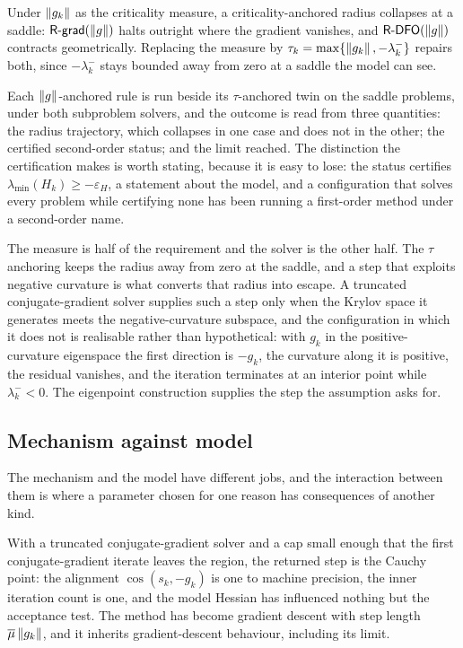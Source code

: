 \documentclass[11pt]{article}
\theoremstyle{plain}
\theoremstyle{definition}
\theoremstyle{remark}
\numberwithin{equation}{section}
\newcommand{\Rdfo}{\textsf{R-DFO}}
\newcommand{\Rgrad}{\textsf{R-grad}}
\begin{document}
Under $\left \lVert g_k \right \rVert$ as the criticality measure, a criticality-anchored radius
collapses at a saddle: $\Rgrad(\norm{g})$ halts outright where the gradient
vanishes, and $\Rdfo(\norm{g})$ contracts geometrically. Replacing the measure by
$\tau_k = \max\{\left \lVert g_k \right \rVert, -\lambda_k^-\}$ repairs both, since
$-\lambda_k^-$ stays bounded away from zero at a saddle the model can see.

Each $\left \lVert g \right \rVert$-anchored rule is run beside its $\tau$-anchored twin on the
saddle problems, under both subproblem solvers, and the outcome is read from
three quantities: the radius trajectory, which collapses in one case and does not
in the other; the certified second-order status; and the limit reached. The
distinction the certification makes is worth stating, because it is easy to lose:
the status certifies $\lambda_{\min}(H_k) \geq -\varepsilon_H$, a statement about
the model, and a configuration that solves every problem while certifying none
has been running a first-order method under a second-order name.\provisional

The measure is half of the requirement and the solver is the other half. The
$\tau$ anchoring keeps the radius away from zero at the saddle, and a step that
exploits negative curvature is what converts that radius into escape. A truncated
conjugate-gradient solver supplies such a step only when the Krylov space it
generates meets the negative-curvature subspace, and the configuration in which
it does not is realisable rather than hypothetical: with $g_k$ in the
positive-curvature eigenspace the first direction is $-g_k$, the curvature along
it is positive, the residual vanishes, and the iteration terminates at an
interior point while $\lambda_k^- < 0$. The eigenpoint construction supplies the
step the assumption asks for.


\subsection{Mechanism against model}
\label{sec: res interaction}

The mechanism and the model have different jobs, and the interaction between them
is where a parameter chosen for one reason has consequences of another kind.

With a truncated conjugate-gradient solver and a cap small enough that the first
conjugate-gradient iterate leaves the region, the returned step is the Cauchy
point: the alignment $\cos(s_k,-g_k)$ is one to machine precision, the inner
iteration count is one, and the model Hessian has influenced nothing but the
acceptance test. The method has become gradient descent with step length
$\overline{\mu}\left \lVert g_k \right \rVert$, and it inherits gradient-descent behaviour, including
its limit.
\end{document}
